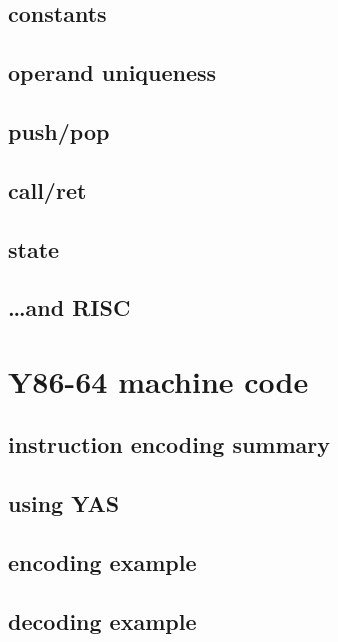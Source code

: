 %



\subsection{constants}



\subsection{operand uniqueness}


\subsection{push/pop}



\subsection{call/ret}


\subsection{state}



\subsection{\ldots and RISC}


\section{Y86-64 machine code}

\subsection{instruction encoding summary}



\subsection{using YAS}


\subsection{encoding example}

%



\subsection{decoding example}



